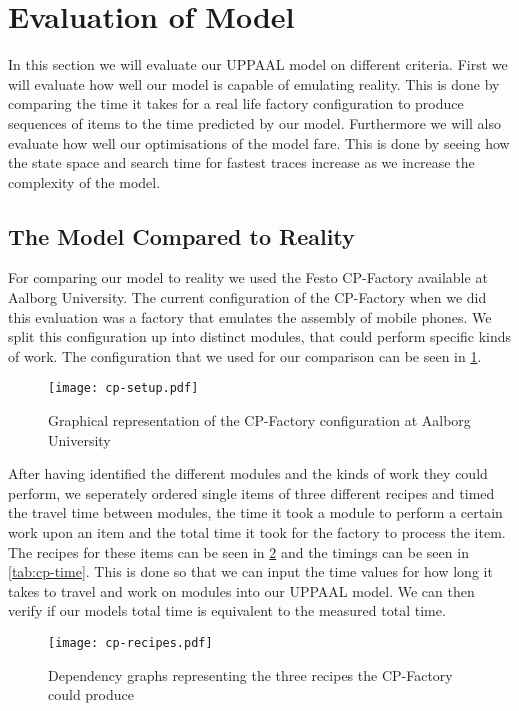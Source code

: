 \section{Evaluation of Model}
In this section we will evaluate our UPPAAL model on different criteria. First we will evaluate how well our model is capable of emulating reality. This is done by comparing the time it takes for a real life factory configuration to produce sequences of items to the time predicted by our model. Furthermore we will also evaluate how well our optimisations of the model fare. This is done by seeing how the state space and search time for fastest traces increase as we increase the complexity of the model.

\subsection{The Model Compared to Reality}
For comparing our model to reality we used the Festo CP-Factory available at Aalborg University. The current configuration of the CP-Factory when we did this evaluation was a factory that emulates the assembly of mobile phones. We split this configuration up into distinct modules, that could perform specific kinds of work. The configuration that we used for our comparison can be seen in \cref{fig:cp-setup}.

\begin{figure}[h]
\centering
\texttt{[image: cp-setup.pdf]}
\caption{Graphical representation of the CP-Factory configuration at Aalborg University}
\label{fig:cp-setup}
\end{figure}

After having identified the different modules and the kinds of work they could perform, we seperately ordered single items of three different recipes and timed the travel time between modules, the time it took a module to perform a certain work upon an item and the total time it took for the factory to process the item. The recipes for these items can be seen in \cref{fig:cp-recipes} and the timings can be seen in \cref{tab:cp-time}. This is done so that we can input the time values for how long it takes to travel and work on modules into our UPPAAL model. We can then verify if our models total time is equivalent to the measured total time.

\begin{figure}[h]
\centering
\texttt{[image: cp-recipes.pdf]}
\caption{Dependency graphs representing the three recipes the CP-Factory could produce}
\label{fig:cp-recipes}
\end{figure}

